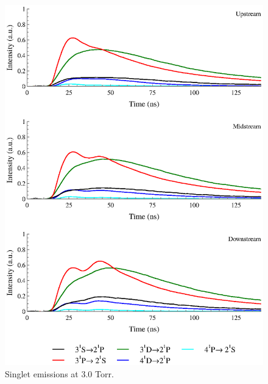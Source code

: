 \begin{figure}
  \centering
  \includegraphics{./chapters/extraem/figures/3torr_s.eps}
  \caption{Singlet emissions at 3.0 Torr.}
\end{figure}
